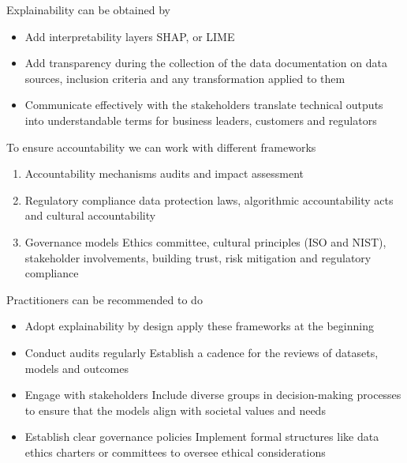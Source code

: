 Explainability can be obtained by
\begin{itemize}
    \item Add interpretability layers \ra SHAP, or LIME
    \item Add transparency during the collection of the data \ra documentation on data sources, inclusion criteria and any transformation applied to them
    \item Communicate effectively with the stakeholders \ra translate technical outputs into understandable terms for business leaders, customers and regulators
\end{itemize}

To ensure accountability we can work with different frameworks

\begin{enumerate}
    \item Accountability mechanisms \ra audits and impact assessment
    \item Regulatory compliance \ra data protection laws, algorithmic accountability acts and cultural accountability
    \item Governance models \ra Ethics committee, cultural principles (ISO and NIST), stakeholder involvements, building trust, risk mitigation and regulatory compliance
\end{enumerate}

Practitioners can be recommended to do
\begin{itemize}
    \item Adopt explainability by design \ra apply these frameworks at the beginning
    \item Conduct audits regularly \ra Establish a cadence for the reviews of datasets, models and outcomes
    \item Engage with stakeholders \ra Include diverse groups in decision-making processes to ensure that the models align with societal values and needs
    \item Establish clear governance policies \ra Implement formal structures like data ethics charters or committees to oversee ethical considerations
\end{itemize}






















